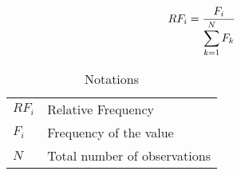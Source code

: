 \begin{table}[H]
    \begin{minipage}{0.3\linewidth}
        \[
            \begin{aligned}
                RF_i 
                    &= \dfrac{F_{i}}{\displaystyle\sum_{k=1}^{N} F_{k}}
            \end{aligned}
        \]
    \end{minipage}
    \begin{minipage}{0.65\linewidth}
        \begin{table}[H]
            \begin{tabular}{l l}
                $RF_i$ & Relative Frequency \\
                $F_i$ & Frequency of the value \\ 
                $N$ & Total number of observations \\ 
            \end{tabular}
            \caption*{Notations}
        \end{table}
    \end{minipage}
\end{table}



